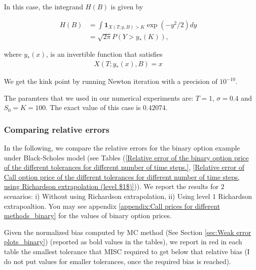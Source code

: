 \documentclass[11pt]{article}
\begin{document}
In this case, the integrand $H(B)$ is given by

\begin{align}\label{smoothed_integrand_binary_opt_2}
	H(B)&= \int \mathbf{1}_{X(T;y,B)>K} \operatorname{exp}(-y^2/2) dy \nonumber\\
	&= \sqrt{2 \pi} P(Y>y_{\ast}(K)) ,
\end{align}
 
where $y_{\ast}(x)$, is an invertible function that satisfies 
\begin{align}
	X(T;y_{\ast}(x),B)=x	
\end{align}

We get the kink point by running Newton iteration with a precision of $10^{-10}$.

The paramters that we used in our numerical experiments are: $T=1$, $\sigma=0.4$ and $S_0=K=100$. The exact value of this case is $0.42074$.

\subsubsection{Comparing relative errors}

In the following, we compare the  relative errors for the binary option example under Black-Scholes model (see Tables (\ref{Relative error of the binary option price of the different tolerances for different number of time steps.}, \ref{Relative error of Call option price of the different tolerances for different number of time steps, using Richardson extrapolation (level $1$)})). We report the results for $2$ scenarios: i) Without using Richardson extrapolation, ii) Using level $1$ Richardson extrapoaltion.  You may see appendix \ref{appendix:Call prices for different methods_binary} for the values of binary option prices.

Given the normalized bias computed by MC method (See Section \ref{sec:Weak error plots_binary}) (reported as bold values in the tables), we report in red in each table the smallest tolerance that MISC required to get below that relative bias (I do not put values for smaller tolerances, once the required bias is reached).
\end{document}
